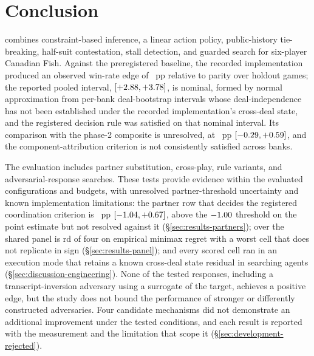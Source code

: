 \section{Conclusion}
\label{sec:conclusion}

\sestina{} combines constraint-based inference, a linear action policy, public-history
tie-breaking, half-suit contestation, stall detection, and guarded search for six-player Canadian
Fish. Against the preregistered \fcheap{} baseline, the recorded implementation produced an
observed win-rate edge of \vsevenBtwoFcheap{}~pp relative to parity over \vsevenBtwoFcheapN{}
holdout games; the reported pooled interval, $[+2.88, +3.78]$, is
nominal, formed by normal approximation from per-bank deal-bootstrap intervals whose
deal-independence has not been established under the recorded implementation's cross-deal state,
and the registered decision rule was satisfied on that nominal interval. Its comparison with the phase-2
composite is unresolved, at \vsevenBtwoComposite{}~pp
$[-0.29, +0.59]$, and the component-attribution criterion is not
consistently satisfied across banks.

The evaluation includes partner substitution, cross-play, rule variants, and adversarial-response
searches. These tests provide evidence within the evaluated configurations and budgets, with
unresolved partner-threshold uncertainty and known implementation limitations: the partner row that
decides the registered coordination criterion is \vsevenSoneMin{}~pp
$[-1.04, +0.67]$, above the $-1.00{}$
threshold on the point estimate but not resolved against it (\S\ref{sec:results-partners}); over
the shared panel \sestina{} is \vsevenRegretFrozenRank{}rd of four on empirical minimax regret with
a worst cell that does not replicate in sign (\S\ref{sec:results-panel}); and every scored cell ran
in an execution mode that retains a known cross-deal state residual in searching agents
(\S\ref{sec:discussion-engineering}). None of the \vsevenBfourArmsWord{} tested responses, including
a transcript-inversion adversary using a \vsix{} surrogate of the target, achieves a positive edge,
but the study does not bound the performance of stronger or differently constructed adversaries.
Four candidate mechanisms did not demonstrate an additional improvement under the tested
conditions, and each result is reported with the measurement and the limitation that scope it
(\S\ref{sec:development-rejected}).

